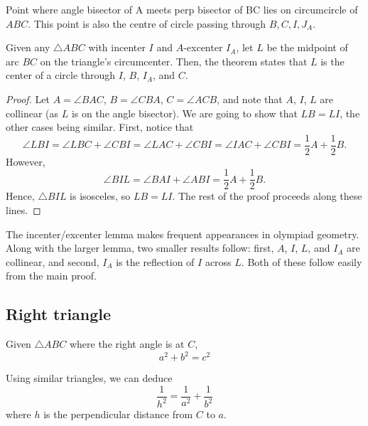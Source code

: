 \begin{proposition}
Point where angle bisector of A meets perp bisector of BC lies on circumcircle of $ABC$. This point is also the centre of circle passing through $B,C,I,J_A$.
\end{proposition}

\begin{proposition}
Given any $\triangle ABC$ with incenter $I$ and $A$-excenter $I_A$, let $L$ be the midpoint of arc ${BC}$ on the triangle's circumcenter. Then, the theorem states that $L$ is the center of a circle through $I$, $B$, $I_A$, and $C$.
\end{proposition}

\begin{proof}
Let $A = \angle BAC$, $B = \angle CBA$, $C = \angle ACB$, and note that $A$, $I$, $L$ are collinear (as $L$ is on the angle bisector). We are going to show that $LB = LI$, the other cases being similar. First, notice that\[\angle LBI = \angle LBC + \angle CBI = \angle LAC + \angle CBI = \angle IAC + \angle CBI = \frac{1}{2} A + \frac{1}{2} B.\]However,\[\angle BIL = \angle BAI + \angle ABI = \frac{1}{2} A + \frac{1}{2} B.\]Hence, $\triangle BIL$ is isosceles, so $LB = LI$. The rest of the proof proceeds along these lines.
\end{proof}

\begin{remark}
The incenter/excenter lemma makes frequent appearances in olympiad geometry. Along with the larger lemma, two smaller results follow: first, $A$, $I$, $L$, and $I_A$ are collinear, and second, $I_A$ is the reflection of $I$ across $L$. Both of these follow easily from the main proof.
\end{remark}

\subsection{Right triangle}
\begin{theorem}
Given $\triangle ABC$ where the right angle is at $C$,
\begin{equation}
a^2+b^2=c^2
\end{equation}
\end{theorem}

Using similar triangles, we can deduce
\begin{equation}
\frac{1}{h^2}=\frac{1}{a^2}+\frac{1}{b^2}
\end{equation}
where $h$ is the perpendicular distance from $C$ to $a$.

